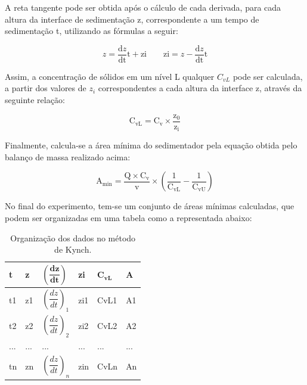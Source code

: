 A reta tangente pode ser obtida após o cálculo de cada derivada, para cada altura da interface de sedimentação z, correspondente a um tempo de sedimentação t, utilizando as fórmulas a seguir:

\begin{equation}\label{key}
z=\frac{\mathrm{d} z}{\mathrm{dt}} \mathrm{t}+\mathrm{zi} \quad \quad \mathrm{zi}=z-\frac{\mathrm{d} z}{\mathrm{dt}} \mathrm{t}
\end{equation}

Assim, a concentração de sólidos em um nível L qualquer $ C_{vL} $ pode ser calculada, a partir dos valores de $ z_{i} $ correspondentes a cada altura da interface z, através da seguinte relação:

\begin{equation}\label{key}
\mathrm{C_{vL}}=\mathrm{C_{v}} \times \frac{\mathrm{z} _{0}}{\mathrm{z_{i}}}
\end{equation}

Finalmente, calcula-se a área mínima do sedimentador pela equação obtida pelo balanço de massa realizado acima:

\begin{equation}\label{key}
\operatorname{A_{min}}=\frac{\mathrm{Q} \times \mathrm{C_{v}}}{\mathrm{v}} \times\left(\frac{1}{\mathrm{C_{vL}}}-\frac{1}{\mathrm{C_{vU}}}\right)
\end{equation}

No final do experimento, tem-se um conjunto de áreas mínimas calculadas, que podem ser organizadas em uma tabela como a representada abaixo:

	

\begin{table}[H]
	\centering
	\begin{tabular}{|l|l|l|l|l|l|}
		\hline
		\textbf{t} & \textbf{z} & $ \mathbf{\left( \dfrac{d z}{dt}  \right)} $ & \textbf{zi} & $ \mathbf{C_{vL}} $ & \textbf{A} \\ \hline
		t1 & z1 & $ \left ( \dfrac{d z}{dt}\right )_{1} $ & zi1 & CvL1 & A1 \\ \hline
		t2 & z2 & $ \left ( \dfrac{d z}{dt} \right )_{2} $ & zi2 & CvL2 & A2 \\ \hline
		... & ... & ... & ... & ... & ... \\ \hline
		tn & zn & $ \left ( \dfrac{d z}{dt}\right )_{n} $ & zin & CvLn & An \\ \hline
	\end{tabular}
	\caption{Organização dos dados no método de Kynch.}
	\label{kynch}
\end{table}


